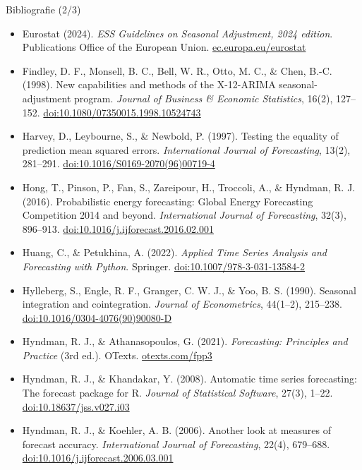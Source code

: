 \begin{frame}{Bibliografie (2/3)}
\itemsize{\scriptsize}
\begin{itemize}
    \item Eurostat (2024). \textit{ESS Guidelines on Seasonal Adjustment, 2024 edition}. Publications Office of the European Union. \href{https://ec.europa.eu/eurostat/web/products-manuals-and-guidelines/w/ks-gq-24-012}{ec.europa.eu/eurostat}
    \item Findley, D. F., Monsell, B. C., Bell, W. R., Otto, M. C., \& Chen, B.-C. (1998). New capabilities and methods of the X-12-ARIMA seasonal-adjustment program. \textit{Journal of Business \& Economic Statistics}, 16(2), 127--152. \href{https://doi.org/10.1080/07350015.1998.10524743}{doi:10.1080/07350015.1998.10524743}
    \item Harvey, D., Leybourne, S., \& Newbold, P. (1997). Testing the equality of prediction mean squared errors. \textit{International Journal of Forecasting}, 13(2), 281--291. \href{https://doi.org/10.1016/S0169-2070(96)00719-4}{doi:10.1016/S0169-2070(96)00719-4}
    \item Hong, T., Pinson, P., Fan, S., Zareipour, H., Troccoli, A., \& Hyndman, R. J. (2016). Probabilistic energy forecasting: Global Energy Forecasting Competition 2014 and beyond. \textit{International Journal of Forecasting}, 32(3), 896--913. \href{https://doi.org/10.1016/j.ijforecast.2016.02.001}{doi:10.1016/j.ijforecast.2016.02.001}
    \item Huang, C., \& Petukhina, A. (2022). \textit{Applied Time Series Analysis and Forecasting with Python}. Springer. \href{https://doi.org/10.1007/978-3-031-13584-2}{doi:10.1007/978-3-031-13584-2}
    \item Hylleberg, S., Engle, R. F., Granger, C. W. J., \& Yoo, B. S. (1990). Seasonal integration and cointegration. \textit{Journal of Econometrics}, 44(1--2), 215--238. \href{https://doi.org/10.1016/0304-4076(90)90080-D}{doi:10.1016/0304-4076(90)90080-D}
    \item Hyndman, R. J., \& Athanasopoulos, G. (2021). \textit{Forecasting: Principles and Practice} (3rd ed.). OTexts. \href{https://otexts.com/fpp3/}{otexts.com/fpp3}
    \item Hyndman, R. J., \& Khandakar, Y. (2008). Automatic time series forecasting: The forecast package for R. \textit{Journal of Statistical Software}, 27(3), 1--22. \href{https://doi.org/10.18637/jss.v027.i03}{doi:10.18637/jss.v027.i03}
    \item Hyndman, R. J., \& Koehler, A. B. (2006). Another look at measures of forecast accuracy. \textit{International Journal of Forecasting}, 22(4), 679--688. \href{https://doi.org/10.1016/j.ijforecast.2006.03.001}{doi:10.1016/j.ijforecast.2006.03.001}
\end{itemize}
\end{frame}

